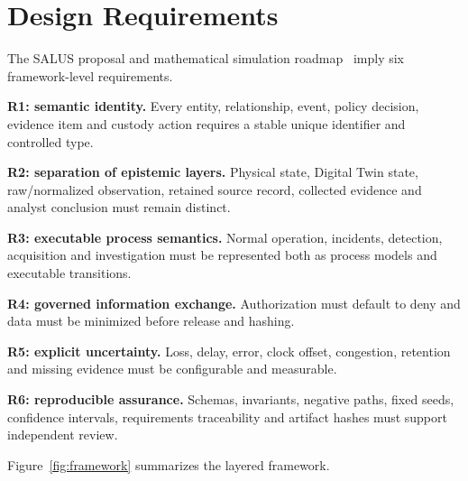 ﻿\documentclass[10pt,a4paper,twocolumn]{article}
\begin{document}
\section{Design Requirements}

The SALUS proposal and mathematical simulation roadmap~\cite{salusproposal,frameworkroadmap} imply six framework-level requirements.

\textbf{R1: semantic identity.} Every entity, relationship, event, policy decision, evidence item and custody action requires a stable unique identifier and controlled type.

\textbf{R2: separation of epistemic layers.} Physical state, Digital Twin state, raw/normalized observation, retained source record, collected evidence and analyst conclusion must remain distinct.

\textbf{R3: executable process semantics.} Normal operation, incidents, detection, acquisition and investigation must be represented both as process models and executable transitions.

\textbf{R4: governed information exchange.} Authorization must default to deny and data must be minimized before release and hashing.

\textbf{R5: explicit uncertainty.} Loss, delay, error, clock offset, congestion, retention and missing evidence must be configurable and measurable.

\textbf{R6: reproducible assurance.} Schemas, invariants, negative paths, fixed seeds, confidence intervals, requirements traceability and artifact hashes must support independent review.

Figure~\ref{fig:framework} summarizes the layered framework.
\end{document}
